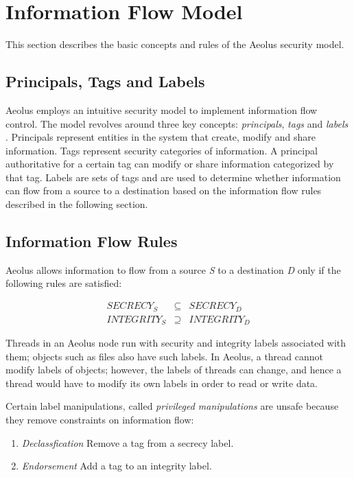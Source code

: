 \section{Information Flow Model}

This section describes the basic concepts and rules of the Aeolus security model.

\subsection{Principals, Tags and Labels}\label{principals}

Aeolus employs an intuitive security model to implement information flow control. The model revolves around three key concepts: \emph{principals}, \emph{tags} and \emph{labels} \cite{aeolus}. Principals represent entities in the system that create, modify and share information. Tags represent security categories of information. A principal authoritative for a certain tag can modify or share information categorized by that tag. Labels are sets of tags and are used to determine whether information can flow from a source to a destination based on the information flow rules described in the following section.

\subsection{Information Flow Rules}\label{difc:rules}

Aeolus allows information to flow from a source \emph{S} to a destination \emph{D} only if the following rules are satisfied:

\begin{eqnarray*}
  SECRECY_{S} &\subseteq& SECRECY_{D} \\
  INTEGRITY_{S} &\supseteq& INTEGRITY_{D}
\end{eqnarray*}

Threads in an Aeolus node run with security and integrity labels associated with them; objects such as files also have such labels. In Aeolus, a thread cannot modify labels of objects; however, the labels of threads can change, and hence a thread would have to modify its own labels in order to read or write data. 

Certain label manipulations, called \emph{privileged manipulations} are unsafe because they remove constraints on information flow:

\begin{enumerate}
  \item \emph{Declassfication} Remove a tag from a secrecy label.
  \item \emph{Endorsement} Add a tag to an integrity label.
\end{enumerate}

